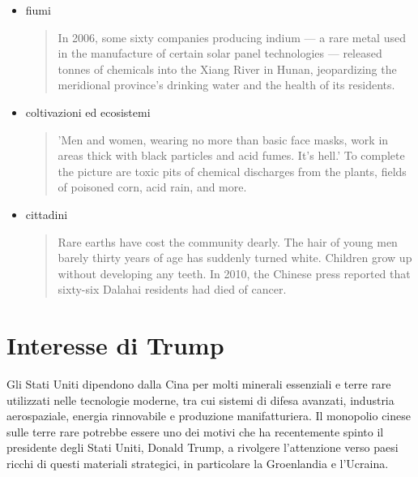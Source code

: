 \documentclass[12pt,a4paper,oneside]{book}
\begin{document}
\begin{itemize}
\item fiumi
\begin{quote}
\small
In 2006, some sixty companies producing indium — a rare metal used in the manufacture of certain solar panel technologies — released tonnes of chemicals into the Xiang River in Hunan, jeopardizing the meridional province's drinking water and the health of its residents. \citep[p. 25]{pitron2020rare}
\end{quote}

\item coltivazioni ed ecosistemi
\begin{quote}
\small
'Men and women, wearing no more than basic face masks, work in areas thick with black particles and acid fumes. It's hell.' To complete the picture are toxic pits of chemical discharges from the plants, fields of poisoned corn, acid rain, and more. \citep[p. 26]{pitron2020rare}
\end{quote}

\item cittadini
\begin{quote}
\small
Rare earths have cost the community dearly. The hair of young men barely thirty years of age has suddenly turned white. Children grow up without developing any teeth. In 2010, the Chinese press reported that sixty-six Dalahai residents had died of cancer. \citep[p. 29]{pitron2020rare}
\end{quote}

\end{itemize}

\section{Interesse di Trump}

Gli Stati Uniti dipendono dalla Cina per molti minerali essenziali e terre rare utilizzati nelle tecnologie moderne, tra cui sistemi di difesa avanzati, industria aerospaziale, energia rinnovabile e produzione manifatturiera.
Il monopolio cinese sulle terre rare potrebbe essere uno dei motivi che ha recentemente spinto il presidente degli Stati Uniti, Donald Trump, a rivolgere l'attenzione verso paesi ricchi di questi materiali strategici, in particolare la Groenlandia e l'Ucraina.
\end{document}
